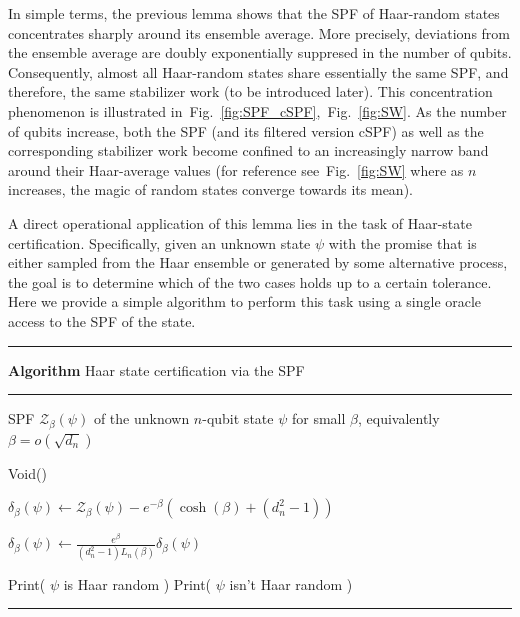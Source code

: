 \documentclass[aps,pra,superscriptaddress,twocolumn,longbibliography]{revtex4-2}
\newcommand{\figref}[1]{Fig.~\ref{#1}}
\newcounter{algorithm}
\renewcommand{\thealgorithm}{\arabic{algorithm}}
\newenvironment{algorithm}[1][]{%
    \refstepcounter{algorithm}%
    \par\medskip
    \hrule
    \smallskip
    \def\caption##1{\textbf{Algorithm \thealgorithm} ##1\par\smallskip\hrule\smallskip}
    \begin{minipage}{\linewidth}
}{%
    \end{minipage}
    \par\smallskip
    \hrule
    \par\medskip
}
\begin{document}
In simple terms, the previous lemma shows that the SPF of Haar-random states concentrates sharply around its ensemble average.
More precisely, deviations from the ensemble average are doubly exponentially suppresed in the number of qubits.
Consequently, almost all Haar-random states share essentially the same SPF, and therefore, the same stabilizer work (to be introduced later).
This concentration phenomenon is illustrated in~\figref{fig:SPF_cSPF},~\figref{fig:SW}.
As the number of qubits increase, both the SPF (and its filtered version cSPF) as well as the corresponding stabilizer work become confined to an increasingly narrow band around their Haar-average values (for reference see~\figref{fig:SW} where as $n$ increases, the magic of random states converge towards its mean).

A direct operational application of this lemma lies in the task of Haar-state certification. Specifically, given an unknown state $\psi$ with the promise that is either sampled from the Haar ensemble or generated by some alternative process, the goal is to determine which of the two cases holds up to a certain tolerance. Here we provide a simple algorithm to perform this task using  a single oracle access to the SPF of the state.
%
\vspace{8pt}
%
\begin{algorithm}
    \caption{Haar state certification via the SPF}
    \label{algorithm:Haar_discrimination}
    \begin{algorithmic}[1]
        \Require SPF $\mathcal{Z}_{\beta}(\psi)$ of the unknown $n$-qubit state $\psi$ for small $\beta$, equivalently $\beta=o(\sqrt{d_{n}})$
        
        \Ensure Void()

        \State $\delta_{\beta}(\psi)\gets \mathcal{Z}_{\beta}(\psi)-e^{-\beta}(\cosh{(\beta)}+(d_{n}^{2}-1))$

        \State $\delta_{\beta}(\psi)\gets \frac{e^{\beta}}{(d_{n}^{2}-1)L_{n}(\beta)}\delta_{\beta}(\psi)$ 

        \vspace{2pt}

        \vspace{1pt}
            \State Print( $\psi$ is Haar random )
        \Else
            \State Print( $\psi$ isn't Haar random )
        \EndIf
        \EndProcedure
    \end{algorithmic}
\end{algorithm}
\end{document}
